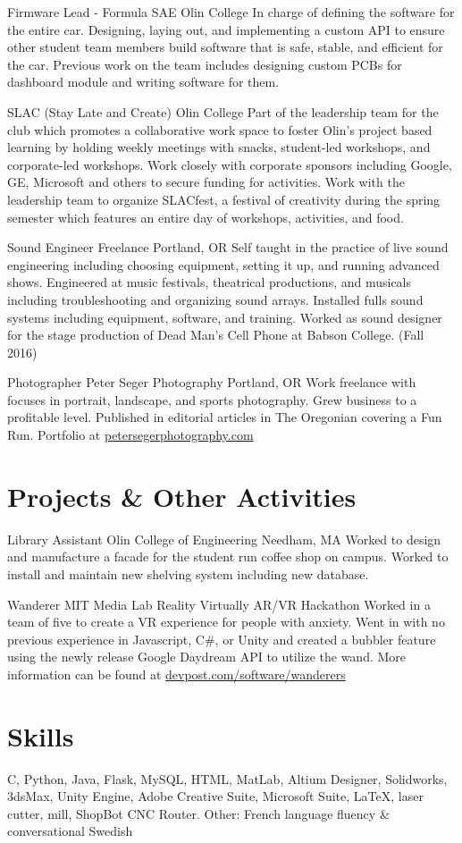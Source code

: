 \documentclass[11 pt]{moderncv}
\begin{document}
{Firmware Lead - Formula SAE}
{Olin College}
{}
{}
{In charge of defining the software for the entire car. Designing, laying out, and implementing a custom API to ensure other student team members build software that is safe, stable, and efficient for the car. Previous work on the team includes designing custom PCBs for dashboard module and writing software for them.}

{SLAC (Stay Late and Create)}
{Olin College}
{}
{}
{Part of the leadership team for the club which promotes a collaborative work space to foster Olin's project based learning by holding weekly meetings with snacks, student-led workshops, and corporate-led workshops. Work closely with corporate sponsors including Google, GE, Microsoft and others to secure funding for activities. Work with the leadership team to organize SLACfest, a festival of creativity during the spring semester which features an entire day of workshops, activities, and food.}

{Sound Engineer}
{Freelance}
{Portland, OR}
{}
{Self taught in the practice of live sound engineering including choosing equipment, setting it up, and running advanced shows. Engineered at music festivals, theatrical productions, and musicals including troubleshooting and organizing sound arrays. Installed fulls sound systems including equipment, software, and training. Worked as sound designer for the stage production of Dead Man's Cell Phone at Babson College. (Fall 2016)}

{Photographer}
{Peter Seger Photography}
{Portland, OR}
{}
{Work freelance with focuses in portrait, landscape, and sports photography. Grew business to a profitable level.
 Published in editorial articles in The Oregonian covering a Fun Run. Portfolio at \href{www.petersegerphotography.com}{petersegerphotography.com}}


\vspace{0.03 in}
\section{Projects \& Other Activities}

{Library Assistant}
{Olin College of Engineering}
{Needham, MA}
{}
{Worked to design and manufacture a facade for the student run coffee shop on campus. Worked to install and maintain new shelving system including new database. }


{Wanderer}
{MIT Media Lab Reality Virtually AR/VR Hackathon}
{}
{}
{Worked in a team of five to create a VR experience for people with anxiety. Went in with no previous experience in Javascript, C\#, or Unity and created a bubbler feature using the newly release Google Daydream API to utilize the wand. More information can be found at \href{https://devpost.com/software/wanderers}{devpost.com/software/wanderers}}

\section{Skills}

\cvline{}
{
C,
Python,
Java,
Flask,
MySQL,
HTML,
MatLab,
Altium Designer,
Solidworks,
3dsMax,
Unity Engine,
Adobe Creative Suite,
Microsoft Suite,
\LaTeX{},
laser cutter,
mill,
ShopBot CNC Router.
}
\cvline{}
{Other: French language fluency \& conversational Swedish}
\end{document}
